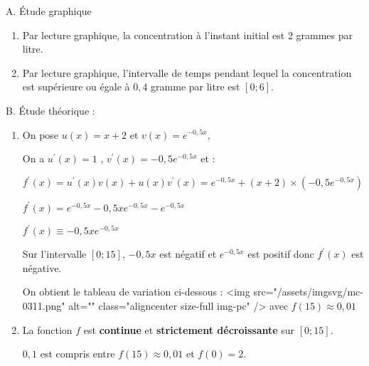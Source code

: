 \begin{corrige}
     \begin{h3}A. Étude graphique\end{h3}
     \begin{enumerate}
          \item
          Par lecture graphique, la concentration à l'instant initial est 2 grammes par litre.
          \item
          Par lecture graphique, l'intervalle de temps pendant lequel la concentration est supérieure ou égale à $0,4$ gramme par litre est $\left[0;6\right]$.
     \end{enumerate}
     \begin{h3}B. Étude théorique :\end{h3}
     \begin{enumerate}
          \item
          On pose $u\left(x\right)=x+2$ et $v\left(x\right)=e^{- 0,5x},$
          \par
          On a $u^{\prime}\left(x\right)=1$ , $v^{\prime}\left(x\right)=-0,5e^{- 0,5x}$ et :
          \par
          $f^{\prime}\left(x\right)=u^{\prime}\left(x\right)v\left(x\right)+u\left(x\right)v^{\prime}\left(x\right)=e^{- 0,5x}+\left(x+2\right)\times \left(-0,5e^{- 0,5x}\right)$
          \par
          $f^{\prime}\left(x\right)=e^{- 0,5x}-0,5xe^{- 0,5x}-e^{- 0,5x}$
          \par
          $f^{\prime}\left(x\right)\equiv -0,5xe^{- 0,5x}$
          \par
          Sur l'intervalle $\left[0 ; 15\right]$, $-0,5x$ est négatif et  $e^{- 0,5x}$ est positif donc $f^{\prime}\left(x\right)$ est négative.
          \par
          On obtient le tableau de variation ci-dessous :
          <img src="/assets/imgsvg/mc-0311.png" alt="" class="aligncenter size-full  img-pc" />
          avec $f\left(15\right)\approx 0,01$
          \item
          La fonction $f$ est \textbf{continue} et \textbf{strictement décroissante} sur $\left[0; 15\right]$.
          \par
          $0,1$ est compris entre $f\left(15\right)\approx 0,01$ et $f\left(0\right)=2$.

\end{enumerate}
\end{corrige}
